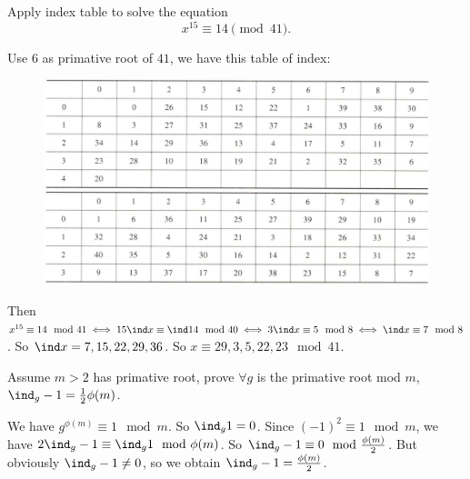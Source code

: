 \documentclass{ctexart}
\begin{document}
\begin{problem}\label{pro:3}
  Apply index table to solve the equation \[
    x^{15 } \equiv 14 \pmod{41}.
  \]
\end{problem}
\begin{solution}
  Use \(6\) as primative root of \(41\), we have this table of index:
  \begin{figure}[H]
    \centering
    \includegraphics[width=\linewidth]{./mod41.png}
  \end{figure}
  Then \(x^{15} \equiv 14 \mod 41 \iff 15 \ind x \equiv \ind 14 \mod 40 \iff 3 \ind x \equiv 5 \mod 8 \iff \ind x \equiv 7 \mod 8\).
  So \(\ind x = 7,15,22,29,36\). So \(x \equiv 29,3,5,22,23 \mod 41\).
\end{solution}

\begin{problem}\label{pro:4}
  Assume \(m >2\) has primative root, prove \(\forall g\) is the primative root mod \(m\),
  \(\ind_g -1=\frac{1}{2}\phi(m)\).
\end{problem}
\begin{solution}
  We have \(g^{\phi(m)} \equiv 1 \mod m\).
  So \(\ind_g 1=0\).
  Since \((-1)^2 \equiv 1 \mod m\), we have \(2 \ind_g -1 \equiv \ind_g 1 \mod \phi(m)\).
  So \(\ind_g -1 \equiv 0 \mod \frac{\phi(m)}{2}\).
  But obviously \(\ind_g -1 \neq 0\), so we obtain \(\ind_g -1 = \frac{\phi(m)}{2}\).
\end{solution}
\end{document}
